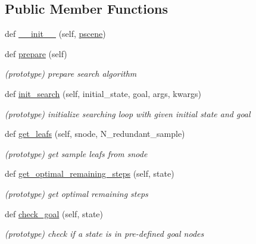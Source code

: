 \subsection*{Public Member Functions}
\begin{DoxyCompactItemize}
\item 
def \hyperlink{classrnb-planning_1_1src_1_1pkg_1_1planning_1_1task_1_1interface_1_1_task_interface_ab4651b9d0aec9ffb3aa345e71a381081}{\+\_\+\+\_\+init\+\_\+\+\_\+} (self, \hyperlink{classrnb-planning_1_1src_1_1pkg_1_1planning_1_1task_1_1interface_1_1_task_interface_aa7ffb430242b8cf040b951cf2828d598}{pscene})
\item 
\mbox{\label{classrnb-planning_1_1src_1_1pkg_1_1planning_1_1task_1_1interface_1_1_task_interface_a1b07c11f533c2c452cb95733171f93c4}} 
def \hyperlink{classrnb-planning_1_1src_1_1pkg_1_1planning_1_1task_1_1interface_1_1_task_interface_a1b07c11f533c2c452cb95733171f93c4}{prepare} (self)
\begin{DoxyCompactList}\small\item\em (prototype) prepare search algorithm \end{DoxyCompactList}\item 
def \hyperlink{classrnb-planning_1_1src_1_1pkg_1_1planning_1_1task_1_1interface_1_1_task_interface_a65de11d10bdf6bd9c56d45e4d13e54a9}{init\+\_\+search} (self, initial\+\_\+state, goal, args, kwargs)
\begin{DoxyCompactList}\small\item\em (prototype) initialize searching loop with given initial state and goal \end{DoxyCompactList}\item 
def \hyperlink{classrnb-planning_1_1src_1_1pkg_1_1planning_1_1task_1_1interface_1_1_task_interface_a061e47756a27984939e4952a6906f6c5}{get\+\_\+leafs} (self, snode, N\+\_\+redundant\+\_\+sample)
\begin{DoxyCompactList}\small\item\em (prototype) get sample leafs from snode \end{DoxyCompactList}\item 
def \hyperlink{classrnb-planning_1_1src_1_1pkg_1_1planning_1_1task_1_1interface_1_1_task_interface_a662506d8de32d7bd9e3402a87a927a6a}{get\+\_\+optimal\+\_\+remaining\+\_\+steps} (self, state)
\begin{DoxyCompactList}\small\item\em (prototype) get optimal remaining steps \end{DoxyCompactList}\item 
def \hyperlink{classrnb-planning_1_1src_1_1pkg_1_1planning_1_1task_1_1interface_1_1_task_interface_aad20b6f99946961f68fd256518eb8ac9}{check\+\_\+goal} (self, state)
\begin{DoxyCompactList}\small\item\em (prototype) check if a state is in pre-\/defined goal nodes \end{DoxyCompactList}\end{DoxyCompactItemize}
